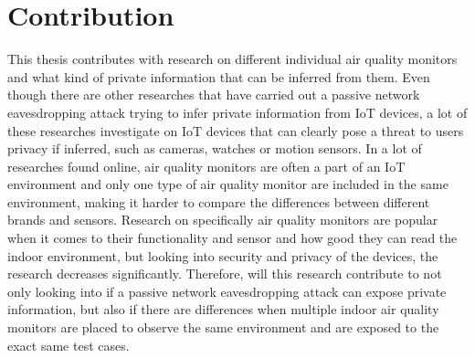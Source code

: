 \section{Contribution}
This thesis contributes with research on different individual air quality monitors and what kind of private information that can be inferred from them. Even though there are other researches that have carried out a passive network eavesdropping attack trying to infer private information from IoT devices, a lot of these researches investigate on IoT devices that can clearly pose a threat to users privacy if inferred, such as cameras, watches or motion sensors. In a lot of researches found online, air quality monitors are often a part of an IoT environment and only one type of air quality monitor are included in the same environment, making it harder to compare the differences between different brands and sensors. Research on specifically air quality monitors are popular when it comes to their functionality and sensor and how good they can read the indoor environment, but looking into security and privacy of the devices, the research decreases significantly. Therefore, will this research contribute to not only looking into if a passive network eavesdropping attack can expose private information, but also if there are differences when multiple indoor air quality monitors are placed to observe the same environment and are exposed to the exact same test cases. 

